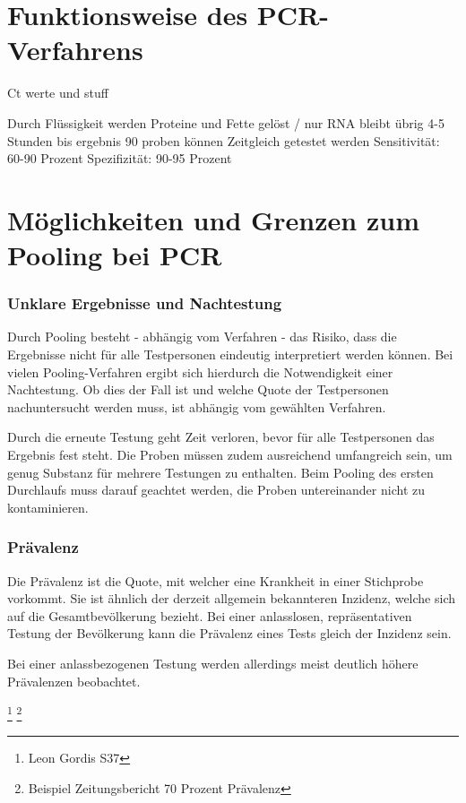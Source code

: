 \cleardoublepage

\section{Funktionsweise des PCR-Verfahrens}
Ct werte und stuff

Durch Flüssigkeit werden Proteine und Fette gelöst / nur RNA bleibt übrig
4-5 Stunden bis ergebnis
90 proben können Zeitgleich getestet werden
Sensitivität: 60-90 Prozent
Spezifizität: 90-95 Prozent

\cleardoublepage

\section{Möglichkeiten und Grenzen zum Pooling bei PCR}
\subsubsection{Unklare Ergebnisse und Nachtestung}
Durch Pooling besteht - abhängig vom Verfahren - das Risiko, dass die Ergebnisse nicht für alle Testpersonen eindeutig interpretiert werden können.
Bei vielen Pooling-Verfahren ergibt sich hierdurch die Notwendigkeit einer Nachtestung.
Ob dies der Fall ist und welche Quote der Testpersonen nachuntersucht werden muss, ist abhängig vom gewählten Verfahren.

Durch die erneute Testung geht Zeit verloren, bevor für alle Testpersonen das Ergebnis fest steht.
Die Proben müssen zudem ausreichend umfangreich sein, um genug Substanz für mehrere Testungen zu enthalten.
Beim Pooling des ersten Durchlaufs muss darauf geachtet werden, die Proben untereinander nicht zu kontaminieren.

\subsubsection{Prävalenz}
Die Prävalenz ist die Quote, mit welcher eine Krankheit in einer Stichprobe vorkommt.
Sie ist ähnlich der derzeit allgemein bekannteren Inzidenz, welche sich auf die Gesamtbevölkerung bezieht.
Bei einer anlasslosen, repräsentativen Testung der Bevölkerung kann die Prävalenz eines Tests gleich der Inzidenz sein.

Bei einer anlassbezogenen Testung werden allerdings meist deutlich höhere Prävalenzen beobachtet.

\footnote{Leon Gordis S37}
\footnote{Beispiel Zeitungsbericht 70 Prozent Prävalenz}


